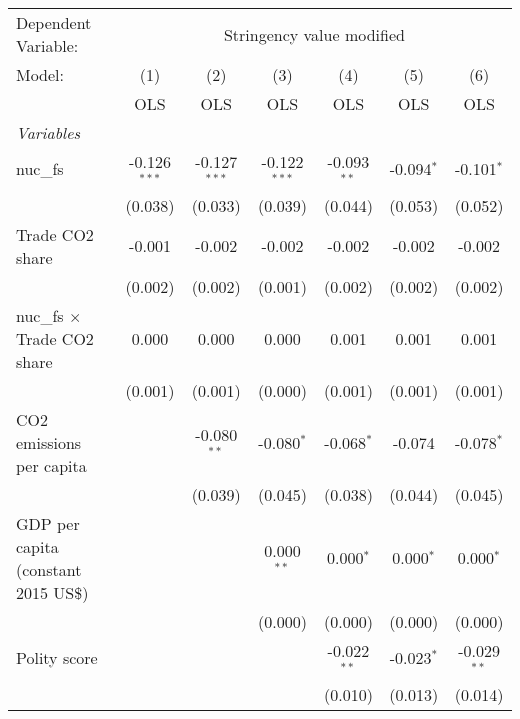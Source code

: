 
\begingroup
\centering
\begin{tabular}{lcccccc}
   \toprule
   Dependent Variable: & \multicolumn{6}{c}{Stringency value modified}\\
   Model:                               & (1)            & (2)            & (3)            & (4)           & (5)          & (6)\\  
                                        &  OLS           & OLS            & OLS            & OLS           & OLS          & OLS\\  
   \midrule
   \emph{Variables}\\
   nuc\_fs                              & -0.126$^{***}$ & -0.127$^{***}$ & -0.122$^{***}$ & -0.093$^{**}$ & -0.094$^{*}$ & -0.101$^{*}$\\   
                                        & (0.038)        & (0.033)        & (0.039)        & (0.044)       & (0.053)      & (0.052)\\   
   Trade CO2 share                      & -0.001         & -0.002         & -0.002         & -0.002        & -0.002       & -0.002\\   
                                        & (0.002)        & (0.002)        & (0.001)        & (0.002)       & (0.002)      & (0.002)\\   
   nuc\_fs $\times$ Trade CO2 share     & 0.000          & 0.000          & 0.000          & 0.001         & 0.001        & 0.001\\   
                                        & (0.001)        & (0.001)        & (0.000)        & (0.001)       & (0.001)      & (0.001)\\   
   CO2 emissions per capita             &                & -0.080$^{**}$  & -0.080$^{*}$   & -0.068$^{*}$  & -0.074       & -0.078$^{*}$\\   
                                        &                & (0.039)        & (0.045)        & (0.038)       & (0.044)      & (0.045)\\   
   GDP per capita (constant 2015 US\$)  &                &                & 0.000$^{**}$   & 0.000$^{*}$   & 0.000$^{*}$  & 0.000$^{*}$\\   
                                        &                &                & (0.000)        & (0.000)       & (0.000)      & (0.000)\\   
   Polity score                         &                &                &                & -0.022$^{**}$ & -0.023$^{*}$ & -0.029$^{**}$\\   
                                        &                &                &                & (0.010)       & (0.013)      & (0.014)\\   

\end{tabular}
